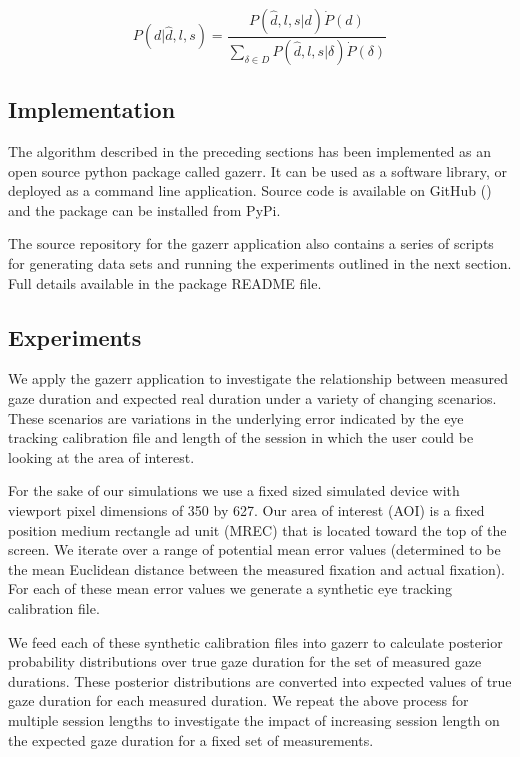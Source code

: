 \documentclass[12pt,a4paper]{article}
\numberwithin{equation}{section}
\begin{document}
\begin{equation}
\label{eq:p_of_d_full}
P(d|\hat{d},l,s) =  \frac{ P(\hat{d},l,s|d) \dot P(d) }{ \sum_{\delta \in D} P(\hat{d},l,s|\delta) \dot P(\delta)  }
\end{equation}

\subsection{Implementation}

The algorithm described in the preceding sections has been implemented as an open source python 
package called gazerr. It can be used as a software library, or deployed as a command line application. Source
code is available on GitHub () and the package can be installed from PyPi.

The source repository for the gazerr application also contains a series of scripts for generating data
sets and running the experiments outlined in the next section. Full details available in the package
README file.

\subsection{Experiments}

We apply the gazerr application to investigate the relationship between measured gaze duration
and expected real duration under a variety of changing scenarios. These scenarios are variations
in the underlying error indicated by the eye tracking calibration file and length of the session
in which the user could be looking at the area of interest.

For the sake of our simulations we use a fixed sized simulated device with viewport pixel 
dimensions of 350 by 627. Our area of interest (AOI) is a fixed position medium rectangle ad unit (MREC)
that is located toward the top of the screen. We iterate over a range of potential mean error
values (determined to be the mean Euclidean distance between the measured fixation and actual fixation).
For each of these mean error values we generate a synthetic eye tracking calibration file.

We feed each of these synthetic calibration files into gazerr to calculate posterior probability
distributions over true gaze duration for the set of measured gaze durations. These posterior
distributions are converted into expected values of true gaze duration for each measured duration.
We repeat the above process for multiple session lengths to investigate the impact of increasing
session length on the expected gaze duration for a fixed set of measurements.
\end{document}
